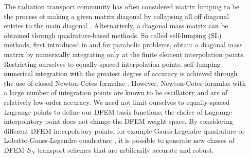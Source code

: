 \documentclass[final,3p,times]{elsarticle}
\begin{document}
The radiation transport community has often considered matrix lumping to be the process of making a given matrix diagonal by collapsing all off diagonal entries to the main diagonal \cite{adams}.
Alternatively, a diagonal mass matrix can be obtained through quadrature-based methods.
So called self-lumping (SL) methods, first introduced in \cite{raviart} and \cite{thomee} for parabolic problems, obtain a diagonal mass matrix by numerically integrating only at the finite element interpolation points.  
Restricting ourselves to equally-spaced interpolation points, self-lumping numerical integration with the greatest degree of accuracy is achieved through the use of closed Newton-Cotes formulae \cite{abramowitz}.  
However, Newton-Cotes formulas with a large number of integration points are known to be oscillatory and are of relatively low-order accuracy. 
We need not limit ourselves to equally-spaced Lagrange points to define our DFEM basis functions; the choice of Lagrange interpolatory point does not change the DFEM weight space.
By considering different DFEM interpolatory points, for example Gauss-Legendre quadrature \cite{abramowitz} or Lobatto-Gauss-Legendre quadrature \cite{abramowitz}, it is possible to generate new classes of DFEM $S_N$ transport schemes that are arbitrarily accurate and robust.
\end{document}
